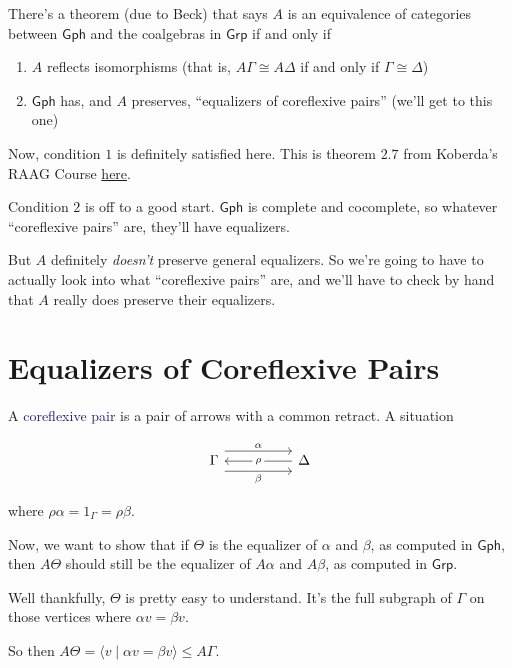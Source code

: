 \documentclass[12pt]{article}
\theoremstyle{definition}
\theoremstyle{theorem}
\newcommand*{\important}[1]{\textcolor{MidnightBlue}{#1}}
\begin{document}
There's a theorem (due to Beck) that says $A$ is an equivalence of categories
between $\mathsf{Gph}$ and the coalgebras in $\mathsf{Grp}$ if and only if

\begin{enumerate}
  \item $A$ reflects isomorphisms (that is, $A\Gamma \cong A\Delta$ if and only if $\Gamma \cong \Delta$)
  \item $\mathsf{Gph}$ has, and $A$ preserves, ``equalizers of coreflexive pairs'' (we'll get to this one)
\end{enumerate}

Now, condition $1$ is definitely satisfied here. This is theorem $2.7$ from
Koberda's RAAG Course \href{https://users.math.yale.edu/users/koberda/raagcourse.pdf}{here}.

Condition $2$ is off to a good start. $\mathsf{Gph}$ is complete and cocomplete,
so whatever ``coreflexive pairs'' are, they'll have equalizers.

But $A$ definitely \emph{doesn't} preserve general equalizers. So we're going to 
have to actually look into what ``coreflexive pairs'' are, and we'll have 
to check by hand that $A$ really does preserve their equalizers.

\section{Equalizers of Coreflexive Pairs}

A \important{coreflexive pair} is a pair of arrows with a common retract. 
A situation

\[\begin{tikzcd}
	\Gamma && \Delta
	\arrow["\alpha", shift left=3, from=1-1, to=1-3]
	\arrow["\beta"', shift right=3, from=1-1, to=1-3]
	\arrow["\rho"{description}, from=1-3, to=1-1]
\end{tikzcd}\]

where $\rho \alpha = 1_\Gamma = \rho \beta$.

Now, we want to show that if $\Theta$ is the equalizer of $\alpha$ and $\beta$,
as computed in $\mathsf{Gph}$, 
then $A\Theta$ should still be the equalizer of $A \alpha$ and $A \beta$, 
as computed in $\mathsf{Grp}$.

Well thankfully, $\Theta$ is pretty easy to understand. It's the full subgraph
of $\Gamma$ on those vertices where $\alpha v = \beta v$.

So then $A\Theta = \langle v \mid \alpha v = \beta v \rangle \leq A \Gamma$.
\end{document}
